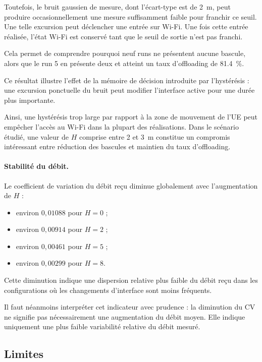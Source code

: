 Toutefois, le bruit gaussien de mesure, dont l'écart-type est de
\SI{2}{m}, peut produire occasionnellement une mesure suffisamment
faible pour franchir ce seuil. Une telle excursion peut déclencher
une entrée sur Wi-Fi. Une fois cette entrée réalisée, l'état Wi-Fi
est conservé tant que le seuil de sortie n'est pas franchi.

Cela permet de comprendre pourquoi neuf runs ne présentent
aucune bascule, alors que le run 5 en présente deux et atteint
un taux d'offloading de \SI{81,4}{\percent}.

Ce résultat illustre l'effet de la mémoire de décision introduite
par l'hystérésis : une excursion ponctuelle du bruit peut modifier
l'interface active pour une durée plus importante.

Ainsi, une hystérésis trop large par rapport à la zone de mouvement
de l'UE peut empêcher l'accès au Wi-Fi dans la plupart des
réalisations. Dans le scénario étudié, une valeur de $H$ comprise
entre 2 et \SI{3}{m} constitue un compromis intéressant entre
réduction des bascules et maintien du taux d'offloading.

\paragraph{Stabilité du débit.}

Le coefficient de variation du débit reçu diminue globalement
avec l'augmentation de $H$ :

\begin{itemize}
\item environ $0{,}01088$ pour $H=0$ ;
\item environ $0{,}00914$ pour $H=2$ ;
\item environ $0{,}00461$ pour $H=5$ ;
\item environ $0{,}00299$ pour $H=8$.
\end{itemize}

Cette diminution indique une dispersion relative plus faible
du débit reçu dans les configurations où les changements
d'interface sont moins fréquents.

Il faut néanmoins interpréter cet indicateur avec prudence :
la diminution du CV ne signifie pas nécessairement une
augmentation du débit moyen. Elle indique uniquement une
plus faible variabilité relative du débit mesuré.

\subsection{Limites}

